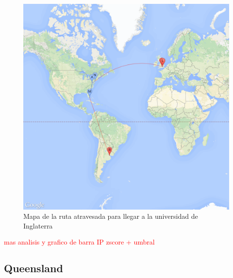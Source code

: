 ~

\begin{figure}[H]
	\begin{center}
		  \includegraphics[scale=0.25]{../results/maps/Oxford.png}
		  \caption{Mapa de la ruta atravesada para llegar a la universidad de Inglaterra}
	\end{center}
\end{figure}

\textcolor{red}{mas analisis y grafico de barra IP zscore + umbral}

\subsection{Queensland}

~

